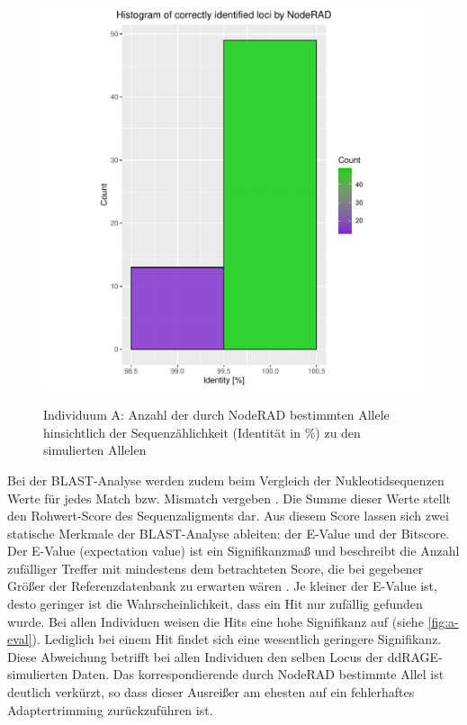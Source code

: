 \begin{figure}[H]
	\begin{center}
		\includegraphics[height=12cm]{bilder/evaluation/hist_perc_ident/A.plot_hist.pdf}
		\caption{Individuum A: Anzahl der durch NodeRAD bestimmten Allele hinsichtlich der Sequenzählichkeit (Identität in $ \% $) zu den simulierten Allelen}
		\label{fig:a-hist}
	\end{center}
\end{figure}


Bei der BLAST-Analyse werden zudem beim Vergleich der Nukleotidsequenzen Werte für jedes Match bzw. Mismatch vergeben \cite{gaedeke_2007}. Die Summe dieser Werte stellt den Rohwert-Score des Sequenzaligments dar. Aus diesem Score lassen sich zwei statische Merkmale der BLAST-Analyse ableiten: der E-Value und der Bitscore. \\

Der E-Value (expectation value) ist ein Signifikanzmaß und beschreibt die Anzahl zufälliger Treffer mit mindestens dem betrachteten Score, die bei gegebener Größer der Referenzdatenbank zu erwarten wären \cite{gaedeke_2007}. Je kleiner der E-Value ist, desto geringer ist die Wahrscheinlichkeit, dass ein Hit nur zufällig gefunden wurde. Bei allen Individuen weisen die Hits eine hohe Signifikanz auf (siehe \autoref{fig:a-eval}). Lediglich bei einem Hit findet sich eine wesentlich geringere Signifikanz. Diese Abweichung betrifft bei allen Individuen den selben Locus der ddRAGE-simulierten Daten. Das korrespondierende durch NodeRAD bestimmte Allel ist deutlich verkürzt, so dass dieser Ausreißer am ehesten auf ein fehlerhaftes Adaptertrimming zurückzuführen ist.\\

